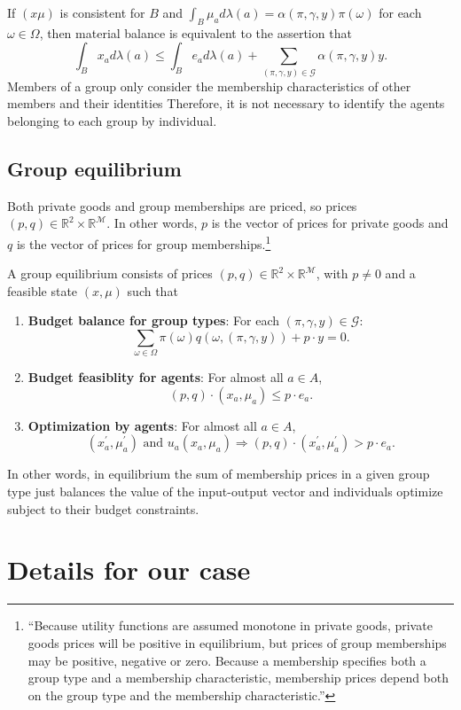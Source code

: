 \documentclass[12pt,letterpaper]{article}
\begin{document}
	If $(x\mu)$ is consistent for $B$ and $\int_B \mu_a d\lambda(a)=\alpha(\pi,\gamma,y)\pi(\omega)$ for each $\omega\in\Omega$, then material balance is equivalent to the assertion that 
	\[
	\int_B x_a d\lambda(a)\le \int_B e_a d\lambda(a) + 
	\sum_{(\pi,\gamma,y)\in\mathcal{G}} \alpha(\pi,\gamma,y)y.
	\]
	Members of a group only consider the membership characteristics of other members and their identities
	Therefore, it is not necessary to identify the agents belonging to each group by individual.
	
	\subsection{Group equilibrium}
	Both private goods and group memberships are priced, so prices $(p,q)\in\mathbb{R}^2\times\mathbb{R}^\mathcal{M}$.
	In other words, $p$ is the vector of prices for private goods and $q$ is the vector of prices for group memberships.\footnote 
	{
		``Because utility functions are assumed monotone in private goods, private goods prices will be positive in equilibrium, but prices of group memberships may be positive, negative or zero. Because a membership speciﬁes both a group type and a membership characteristic, membership prices depend both on the group type and the membership characteristic.''
	}
	
	A group equilibrium consists of prices $(p,q)\in\mathbb{R}^2\times\mathbb{R}^\mathcal{M}$, with $p\ne 0$ and a feasible state $(x,\mu)$ such that 
	\begin{enumerate}
		\item \textbf{Budget balance for group types}: For each $(\pi,\gamma,y)\in\mathcal{G}$:
		\[
		\sum_{\omega\in\Omega}\pi(\omega)q(\omega,(\pi,\gamma,y))+p\cdot y=0.
		\]
		\item \textbf{Budget feasiblity for agents}: For almost all $a\in A$,
		\[
		(p,q)\cdot(x_a,\mu_a)\le p\cdot e_a.
		\]
		\item \textbf{Optimization by agents}: For almost all $a\in A$,
		\[
		(x^\prime_a,\mu^\prime_a)\text{ and } u_a(x_a,\mu_a)\Rightarrow (p,q)\cdot	(x^\prime_a,\mu^\prime_a)>p\cdot e_a.
		\]		
	\end{enumerate}
	In other words, in equilibrium the sum of membership prices in a given group type just balances the value of the input-output vector and individuals optimize subject to their budget constraints.
	
	\section{Details for our case}
	
\end{document}
